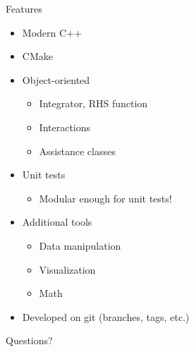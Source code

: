 \documentclass[aspectratio=169]{beamer}
\begin{document}
\begin{frame}{Features}
  \begin{itemize}
    \item Modern C++
    \item CMake
    \item Object-oriented
      \begin{itemize}
        \item Integrator, RHS function
        \item Interactions
        \item Assistance classes 
      \end{itemize}
    \item Unit tests
      \begin{itemize}
        \item Modular enough for unit tests!
      \end{itemize}
    \item Additional tools
      \begin{itemize}
        \item Data manipulation
        \item Visualization
        \item Math
      \end{itemize}
    \item Developed on git (branches, tags, etc.)
  \end{itemize}
\end{frame}

\begin{frame}[standout]
  Questions?
\end{frame}

\appendix
\end{document}
